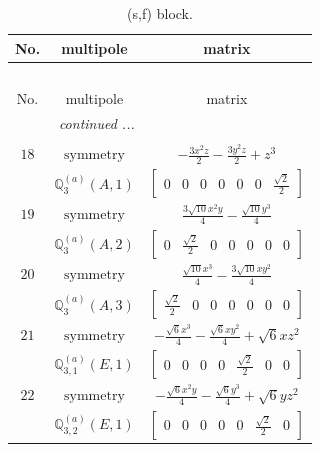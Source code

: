 \documentclass[fleqn,8pt,landscape]{jsarticle}
\begin{document}
\begin{longtable}{ccc}
\caption{(s,f) block.}
 \\
 \hline \hline
No. & multipole & matrix \\ \hline \endfirsthead

\multicolumn{2}{l}{\tablename\ \thetable{}} \\
 \hline \hline
No. & multipole & matrix \\ \hline \endhead

 \hline \hline
\multicolumn{2}{r}{\footnotesize\it continued ...} \\ \endfoot

 \hline \hline
\multicolumn{2}{r}{} \\ \endlastfoot

$ 18 $ & $ \text{symmetry} $ & $ - \frac{3 x^{2} z}{2} - \frac{3 y^{2} z}{2} + z^{3} $ \\
$  $ & $ \mathbb{Q}_{3}^{(a)}(A,1) $ & $ \begin{bmatrix} 0 & 0 & 0 & 0 & 0 & 0 & \frac{\sqrt{2}}{2} \end{bmatrix} $ \\ \hline
$ 19 $ & $ \text{symmetry} $ & $ \frac{3 \sqrt{10} x^{2} y}{4} - \frac{\sqrt{10} y^{3}}{4} $ \\
$  $ & $ \mathbb{Q}_{3}^{(a)}(A,2) $ & $ \begin{bmatrix} 0 & \frac{\sqrt{2}}{2} & 0 & 0 & 0 & 0 & 0 \end{bmatrix} $ \\ \hline
$ 20 $ & $ \text{symmetry} $ & $ \frac{\sqrt{10} x^{3}}{4} - \frac{3 \sqrt{10} x y^{2}}{4} $ \\
$  $ & $ \mathbb{Q}_{3}^{(a)}(A,3) $ & $ \begin{bmatrix} \frac{\sqrt{2}}{2} & 0 & 0 & 0 & 0 & 0 & 0 \end{bmatrix} $ \\ \hline
$ 21 $ & $ \text{symmetry} $ & $ - \frac{\sqrt{6} x^{3}}{4} - \frac{\sqrt{6} x y^{2}}{4} + \sqrt{6} x z^{2} $ \\
$  $ & $ \mathbb{Q}_{3,1}^{(a)}(E,1) $ & $ \begin{bmatrix} 0 & 0 & 0 & 0 & \frac{\sqrt{2}}{2} & 0 & 0 \end{bmatrix} $ \\ \hline
$ 22 $ & $ \text{symmetry} $ & $ - \frac{\sqrt{6} x^{2} y}{4} - \frac{\sqrt{6} y^{3}}{4} + \sqrt{6} y z^{2} $ \\
$  $ & $ \mathbb{Q}_{3,2}^{(a)}(E,1) $ & $ \begin{bmatrix} 0 & 0 & 0 & 0 & 0 & \frac{\sqrt{2}}{2} & 0 \end{bmatrix} $ \\ \hline

\end{longtable}
\end{document}
